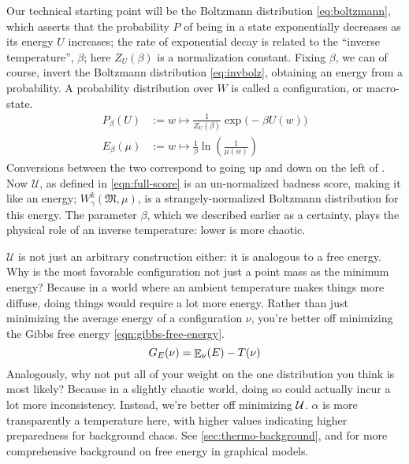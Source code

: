 \documentclass{article}
\theoremstyle{plain}
\theoremstyle{definition}
\theoremstyle{remark}
\let\H\relax
\DeclareMathOperator{\H}{\mathrm{H}} %
\DeclareMathOperator*{\E}{\mathbb{E}} %
\newcommand{\dg}[1]{\mathfrak{#1}}
\numberwithin{equation}{section}
\begin{document}
	Our technical starting point will be the Boltzmann distribution \eqref{eq:boltzmann}, which asserts that the probability $P$ of being in a state exponentially decreases as its energy $U$ increases; the rate of exponential decay is related to the ``inverse temperature'', $\beta$; here $Z_U(\beta)$ is a normalization constant. Fixing $\beta$, we can of course, invert the Boltzmann distribution \eqref{eq:invbolz}, obtaining an energy from a probability. A probability distribution over $W$ is called a configuration, or macro-state.
 	\begin{align}
	 P_{\beta}(U) &:= w \mapsto  \frac{1}{Z_U(\beta)}\exp\Big(-\beta U(w)\Big) \label{eq:boltzmann} \\
 		E_{\beta}(\mu) &:= w \mapsto \frac{1}{\beta} \ln \left(\frac{1}{\mu(w)}\right) \label{eq:invbolz}
 	\end{align}
 	Conversions between the two correspond to going up and down on the left of . 
 	Now $\mathcal U$, as defined in \eqref{eqn:full-score} is an un-normalized badness score, making it like an energy; $W^k_\gamma(\dg M, \mu)$, is a strangely-normalized Boltzmann distribution for this energy. The parameter $\beta$, which we described earlier as a certainty, plays the physical role of an inverse temperature: lower is more chaotic. 
 	
 	$\mathcal U$ is not just an arbitrary construction either: it is analogous to a free energy. Why is the most favorable configuration not just a point mass as the minimum energy? Because in a world where an ambient temperature makes things more diffuse, doing things would require a lot more energy. Rather than just minimizing the average energy of a configuration $\nu$, you're better off minimizing the Gibbs free energy \eqref{eqn:gibbs-free-energy}. 
 	\begin{equation}
 		G_E(\nu) = {\E}_\nu( E )  - T \H(\nu) \label{eqn:gibbs-free-energy}
 	\end{equation}
 	Analogously, why not put all of your weight on the one distribution you think is most likely? Because in a slightly chaotic world, doing so could actually incur a lot more inconsistency. Instead, we're better off minimizing $\cal U$. $\alpha$ is more transparently a temperature here, with higher values indicating higher preparedness for background chaos. 
	See \ref{sec:thermo-background}, and \cite{bethe,friston2009free} for more comprehensive background on free energy
	in graphical models.
	
\end{document}
